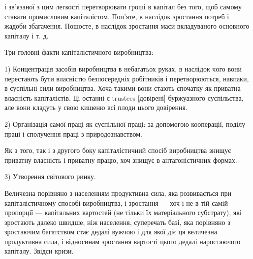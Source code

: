 \parcont{}  %
і зв’язаної з цим легкості перетворювати гроші в капітал без того,
щоб самому ставати промисловим капіталістом. Поп’яте, в наслідок
зростання потреб і жадоби збагачення. Пошосте, в наслідок
зростання маси вкладуваного основного капіталу і т. д.

Три головні факти капіталістичного виробництва:

1) Концентрація засобів виробництва в небагатьох руках,
в наслідок чого вони перестають бути власністю безпосередніх
робітників і перетворюються, навпаки, в суспільні сили виробництва.
Хоча такими вони стають спочатку як приватна власність
капіталістів. Ці останні є trustees [довірені] буржуазного суспільства,
але вони кладуть у свою кишеню всі плоди цього довірення.

2) Організація самої праці як суспільної праці: за допомогою
кооперації, поділу праці і сполучення праці з природознавством.

Як з того, так і з другого боку капіталістичний спосіб виробництва
знищує приватну власність і приватну працю, хоч
знищує в антагоністичних формах.

3) Утворення світового ринку.

Величезна порівняно з населенням продуктивна сила, яка розвивається
при капіталістичному способі виробництва, і зростання
— хоч і не в тій самій пропорції — капітальних вартостей
(не тільки їх матеріального субстрату), які зростають далеко
швидше, ніж населення, суперечать базі, яка порівняно з зростаючим
багатством стає дедалі вужчою і для якої діє ця величезна
продуктивна сила, і відносинам зростання вартості цього
дедалі наростаючого капіталу. Звідси кризи.
\parbreak{}  %
